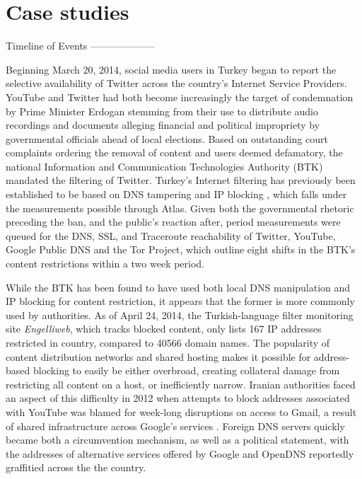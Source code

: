 \section{Case studies}



Timeline of Events
--------------------

Beginning March 20, 2014, social media users in Turkey began to report the selective availability of Twitter across the country's Internet Service Providers. YouTube and Twitter had both become increasingly the target of condemnation by Prime Minister Erdogan stemming from their use to distribute audio recordings and documents alleging financial and political impropriety by governmental officials ahead of local elections. Based on outstanding court complaints ordering the removal of content and users deemed defamatory, the national Information and Communication Technologies Authority (BTK) mandated the filtering of Twitter. Turkey's Internet filtering has previously been established to be based on DNS tampering and IP blocking \cite{akdeniz2010report}, which falls under the measurements possible through Atlas. Given both the governmental rhetoric preceding the ban, and the public's reaction after, period measurements were queued for the DNS, SSL, and Traceroute reachability of Twitter, YouTube, Google Public DNS and the Tor Project, which outline eight shifts in the BTK's content restrictions within a two week period.

While the BTK has been found to have used both local DNS manipulation and IP blocking for content restriction, it appears that the former is more commonly used by authorities. As of April 24, 2014, the Turkish-language filter monitoring site \textit{Engelliweb}, which tracks blocked content, only lists 167 IP addresses restricted in country, compared to 40566 domain names. The popularity of content distribution networks and shared hosting makes it possible for address-based blocking to easily be either overbroad, creating collateral damage from restricting all content on a host, or inefficiently narrow. Iranian authorities faced an aspect of this difficulty in 2012 when attempts to block addresses associated with YouTube was blamed for week-long disruptions on access to Gmail, a result of shared infrastructure across Google's services \cite{bbc2012gmail}. Foreign DNS servers quickly became both a circumvention mechanism, as well as a political statement, with the addresses of alternative services offered by Google and OpenDNS reportedly graffitied across the the country.

